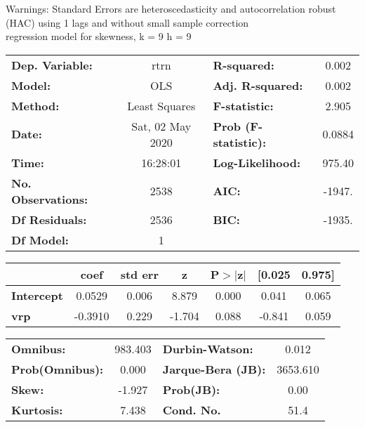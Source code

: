 Warnings: \newline
 [1] Standard Errors are heteroscedasticity and autocorrelation robust (HAC) using 1 lags and without small sample correction\\ 

regression model for skewness, k = 9 h = 9\begin{center}
\begin{tabular}{lclc}
\toprule
\textbf{Dep. Variable:}    &       rtrn       & \textbf{  R-squared:         } &     0.002   \\
\textbf{Model:}            &       OLS        & \textbf{  Adj. R-squared:    } &     0.002   \\
\textbf{Method:}           &  Least Squares   & \textbf{  F-statistic:       } &     2.905   \\
\textbf{Date:}             & Sat, 02 May 2020 & \textbf{  Prob (F-statistic):} &   0.0884    \\
\textbf{Time:}             &     16:28:01     & \textbf{  Log-Likelihood:    } &    975.40   \\
\textbf{No. Observations:} &        2538      & \textbf{  AIC:               } &    -1947.   \\
\textbf{Df Residuals:}     &        2536      & \textbf{  BIC:               } &    -1935.   \\
\textbf{Df Model:}         &           1      & \textbf{                     } &             \\
\bottomrule
\end{tabular}
\begin{tabular}{lcccccc}
                   & \textbf{coef} & \textbf{std err} & \textbf{z} & \textbf{P$> |$z$|$} & \textbf{[0.025} & \textbf{0.975]}  \\
\midrule
\textbf{Intercept} &       0.0529  &        0.006     &     8.879  &         0.000        &        0.041    &        0.065     \\
\textbf{vrp}       &      -0.3910  &        0.229     &    -1.704  &         0.088        &       -0.841    &        0.059     \\
\bottomrule
\end{tabular}
\begin{tabular}{lclc}
\textbf{Omnibus:}       & 983.403 & \textbf{  Durbin-Watson:     } &    0.012  \\
\textbf{Prob(Omnibus):} &   0.000 & \textbf{  Jarque-Bera (JB):  } & 3653.610  \\
\textbf{Skew:}          &  -1.927 & \textbf{  Prob(JB):          } &     0.00  \\
\textbf{Kurtosis:}      &   7.438 & \textbf{  Cond. No.          } &     51.4  \\
\bottomrule
\end{tabular}
\end{center}


